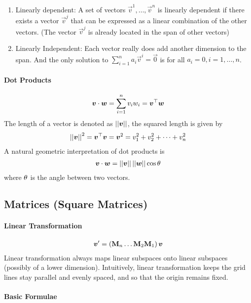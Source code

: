 \begin{enumerate}
	\item Linearly dependent: A set of vectors $\vec{v}^1,\dotsc,\vec{v}^n$ is linearly dependent if there exists a vector $\vec{v}^j$ that can be expressed as a linear combination of the other vectors. (The vector $\vec{v}^j$ is already located in the span of other vectors)
	\item Linearly Independent: Each vector really does add another dimension to the span. And the only solution to $\sum_{i=1}^na_i\vec{v}^i=\vec{0}$ is for all $a_i=0, i=1,\dotsc,n$.
\end{enumerate}

\paragraph{Dot Products}

\begin{align*}
	\boldsymbol{v}\cdot\boldsymbol{w}=\sum_{i=1}^nv_iw_i=\boldsymbol{v}{}^\top\boldsymbol{w}
\end{align*}
The length of a vector is denoted as $\left\vert\left\vert \boldsymbol{v} \right\vert\right\vert$, the squared length is given by
\begin{align*}
	\left\vert\left\vert \boldsymbol{v} \right\vert\right\vert^2=\boldsymbol{v}{}^\top\boldsymbol{v}=\boldsymbol{v}^2=v_1^2+v_2^2+\dots+v_n^2
\end{align*}
A natural geometric interpretation of dot products is
\begin{align*}
	\boldsymbol{v}\cdot\boldsymbol{w}=\left\vert\left\vert \boldsymbol{v} \right\vert\right\vert\left\vert\left\vert \boldsymbol{w} \right\vert\right\vert\cos\theta
\end{align*}
where $\theta$ is the angle between two vectors.

\subsection{Matrices (Square Matrices)}

\paragraph{Linear Transformation}

\begin{align*}
	\boldsymbol{v}'=\left(\mathbf{M}_n\dots\mathbf{M}_2\mathbf{M}_1\right)\boldsymbol{v}
\end{align*}
Linear transformation always maps linear subspaces onto linear subspaces (possibly of a lower dimension). Intuitively, linear transformation keeps the grid lines stay parallel and evenly spaced, and so that the origin remains fixed.

\paragraph{Basic Formulae}

